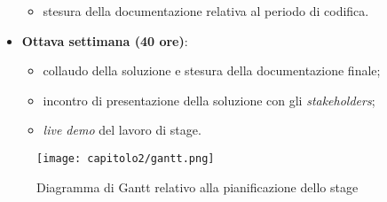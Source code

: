 \begin{itemize}
\begin{itemize}
      \item stesura della documentazione relativa al periodo di codifica.
  \end{itemize}
  \item \textbf{Ottava settimana (40 ore)}:
  \begin{itemize}
      \item collaudo della soluzione e stesura della documentazione finale;
      \item incontro di presentazione della soluzione con gli \textit{stakeholders};
      \item \textit{live demo} del lavoro di stage.
  \end{itemize}
\end{itemize}

\begin{figure}[!h]
  \centering
  \texttt{[image: capitolo2/gantt.png]}
  \caption{Diagramma di Gantt relativo alla pianificazione dello stage}
\end{figure}

